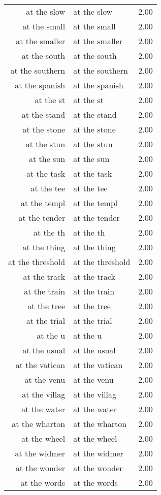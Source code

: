 \begin{table}[ht]
\begin{tabular}{rlr}
  at the slow & at the slow & 2.00 \\ 
  at the small & at the small & 2.00 \\ 
  at the smaller & at the smaller & 2.00 \\ 
  at the south & at the south & 2.00 \\ 
  at the southern & at the southern & 2.00 \\ 
  at the spanish & at the spanish & 2.00 \\ 
  at the st & at the st & 2.00 \\ 
  at the stand & at the stand & 2.00 \\ 
  at the stone & at the stone & 2.00 \\ 
  at the stun & at the stun & 2.00 \\ 
  at the sun & at the sun & 2.00 \\ 
  at the task & at the task & 2.00 \\ 
  at the tee & at the tee & 2.00 \\ 
  at the templ & at the templ & 2.00 \\ 
  at the tender & at the tender & 2.00 \\ 
  at the th & at the th & 2.00 \\ 
  at the thing & at the thing & 2.00 \\ 
  at the threshold & at the threshold & 2.00 \\ 
  at the track & at the track & 2.00 \\ 
  at the train & at the train & 2.00 \\ 
  at the tree & at the tree & 2.00 \\ 
  at the trial & at the trial & 2.00 \\ 
  at the u & at the u & 2.00 \\ 
  at the usual & at the usual & 2.00 \\ 
  at the vatican & at the vatican & 2.00 \\ 
  at the venu & at the venu & 2.00 \\ 
  at the villag & at the villag & 2.00 \\ 
  at the water & at the water & 2.00 \\ 
  at the wharton & at the wharton & 2.00 \\ 
  at the wheel & at the wheel & 2.00 \\ 
  at the widmer & at the widmer & 2.00 \\ 
  at the wonder & at the wonder & 2.00 \\ 
  at the words & at the words & 2.00 \\ 

\end{tabular}
\end{table}

